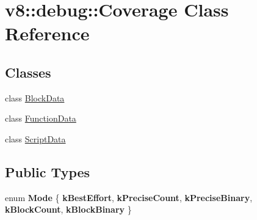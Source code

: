 \hypertarget{classv8_1_1debug_1_1Coverage}{}\section{v8\+:\+:debug\+:\+:Coverage Class Reference}
\label{classv8_1_1debug_1_1Coverage}
\subsection*{Classes}
\begin{DoxyCompactItemize}
\item 
class \mbox{\hyperlink{classv8_1_1debug_1_1Coverage_1_1BlockData}{Block\+Data}}
\item 
class \mbox{\hyperlink{classv8_1_1debug_1_1Coverage_1_1FunctionData}{Function\+Data}}
\item 
class \mbox{\hyperlink{classv8_1_1debug_1_1Coverage_1_1ScriptData}{Script\+Data}}
\end{DoxyCompactItemize}
\subsection*{Public Types}
\begin{DoxyCompactItemize}
\item 
\mbox{\label{classv8_1_1debug_1_1Coverage_abe32905368fbf1082081c9ac4387bd2a}} 
enum {\bfseries Mode} \{ \newline
{\bfseries k\+Best\+Effort}, 
{\bfseries k\+Precise\+Count}, 
{\bfseries k\+Precise\+Binary}, 
{\bfseries k\+Block\+Count}, 
\newline
{\bfseries k\+Block\+Binary}
 \}
\end{DoxyCompactItemize}
